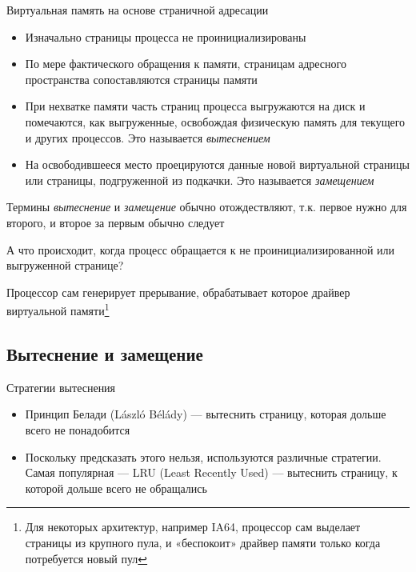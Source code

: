 \documentclass[xetex,aspectratio=43]{beamer}
\begin{document}
\begin{frame}{Виртуальная память на основе страничной адресации}
    \begin{itemize}
        \tightlist
        \item
        Изначально страницы процесса не проинициализированы
        \item
        По мере фактического обращения к памяти, страницам адресного
        пространства сопоставляются страницы памяти
        \item
        При нехватке памяти часть страниц процесса выгружаются на диск и
        помечаются, как выгруженные, освобождая физическую память для текущего
        и других процессов. Это называется \emph{вытеснением}
        \item На освободившееся место проецируются данные новой виртуальной страницы или
        страницы, подгруженной из подкачки.  Это называется \emph{замещением}
    \end{itemize}

    Термины \emph{вытеснение} и \emph{замещение} обычно отождествляют, т.к. первое нужно для второго, и второе за первым обычно следует

    \pause

    А что происходит, когда процесс обращается к не проинициализированной
    или выгруженной странице?

    \pause

    Процессор сам генерирует прерывание, обрабатывает которое драйвер
    виртуальной памяти\footnote{Для некоторых архитектур, например IA64, процессор сам выделает страницы из крупного пула, и «беспокоит» драйвер памяти только когда потребуется новый пул}
\end{frame}


\subsection{Вытеснение и замещение}

\begin{frame}{Стратегии вытеснения}
    \begin{itemize}
        \item
        Принцип Белади (L\'aszl\'o B\'el\'ady) --- вытеснить страницу, которая дольше
        всего не понадобится

        \pause

        \item
        Поскольку предсказать этого нельзя, используются различные стратегии.
        Самая популярная --- LRU (Least Recently Used) --- вытеснить страницу,
        к которой дольше всего не обращались
    \end{itemize}
\end{frame}
\end{document}
